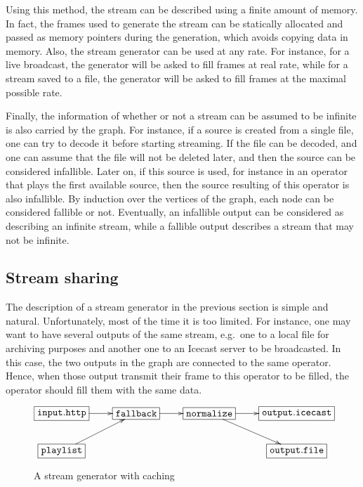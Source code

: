 \documentclass{llncs}
\newcommand{\eg}{{e.g.}}
\begin{document}
Using this method, the stream can be described using a finite amount of memory. In fact, the frames used
to generate the stream can be statically allocated and passed as memory pointers during the generation, which 
avoids copying data in memory. Also, the stream generator can be used at any rate. For instance,
for a live broadcast, the generator will be asked to fill frames at real rate, while 
for a stream saved to a file, the generator will be asked to fill frames at the maximal possible rate.

Finally, the information of whether or not a stream can be assumed to be infinite is also carried by the 
graph. For instance, if a source is created from a single file, one can try to decode it before starting 
streaming. If the file can be decoded, and one can assume that the file will not be deleted later, and then 
the source can be considered infallible. Later on, if this source is used, for instance in an operator that plays 
the first available source, then the source resulting of this operator is also infallible.
By induction over the vertices of the graph, each node can be considered fallible or not. Eventually,
an infallible output can be considered as describing an infinite stream, while a fallible
output describes a stream that may not be infinite.

\subsection*{Stream sharing}

The description of a stream generator in the previous section is simple and 
natural. Unfortunately, most of the time it is too limited. For instance, one 
may want to have several outputs of the same 
stream, \eg\ one to a local file for archiving purposes and another one to an Icecast server to be
broadcasted.
In this case, the two outputs in the graph are connected to the same operator. Hence, when those output
transmit their frame to this operator to be filled, the operator should fill them with the same data.

\begin{figure}[htn]
 \begin{center}
\[
\xymatrix{
  *+[F]{\mathtt{input.http}}\ar[r]&*+[F]{\mathtt{fallback}}\ar[r]&
  *+[F]{\mathtt{normalize}}\ar[r]\ar[dr]&
  *+[F]{\mathtt{output.icecast}}\\
  *+[F]{\mathtt{playlist}}\ar[ur]& & & *+[F]{\mathtt{output.file}}\\
}
\]
\end{center}
 \caption{A stream generator with caching}
\end{figure}
\end{document}
